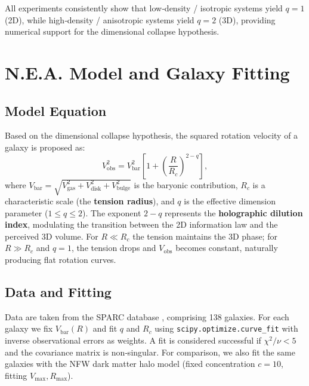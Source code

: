 \documentclass[12pt,a4paper]{article}
\begin{document}
All experiments consistently show that low‑density / isotropic systems yield $q=1$ (2D), while high‑density / anisotropic systems yield $q=2$ (3D), providing numerical support for the dimensional collapse hypothesis.

\section{N.E.A. Model and Galaxy Fitting}
\subsection{Model Equation}
Based on the dimensional collapse hypothesis, the squared rotation velocity of a galaxy is proposed as:
\begin{equation}
V_{\text{obs}}^2 = V_{\text{bar}}^2 \left[ 1 + \left( \frac{R}{R_c} \right)^{2-q} \right], \label{eq:nea}
\end{equation}
where $V_{\text{bar}} = \sqrt{V_{\text{gas}}^2 + V_{\text{disk}}^2 + V_{\text{bulge}}^2}$ is the baryonic contribution, $R_c$ is a characteristic scale (the \textbf{tension radius}), and $q$ is the effective dimension parameter ($1\le q\le 2$). The exponent $2-q$ represents the \textbf{holographic dilution index}, modulating the transition between the 2D information law and the perceived 3D volume. For $R\ll R_c$ the tension maintains the 3D phase; for $R\gg R_c$ and $q=1$, the tension drops and $V_{\text{obs}}$ becomes constant, naturally producing flat rotation curves.

\subsection{Data and Fitting}
Data are taken from the SPARC database \cite{Lelli2016}, comprising 138 galaxies. For each galaxy we fix $V_{\text{bar}}(R)$ and fit $q$ and $R_c$ using \texttt{scipy.optimize.curve\_fit} with inverse observational errors as weights. A fit is considered successful if $\chi^2/\nu<5$ and the covariance matrix is non‑singular. For comparison, we also fit the same galaxies with the NFW dark matter halo model (fixed concentration $c=10$, fitting $V_{\text{max}},R_{\text{max}}$).
\end{document}

